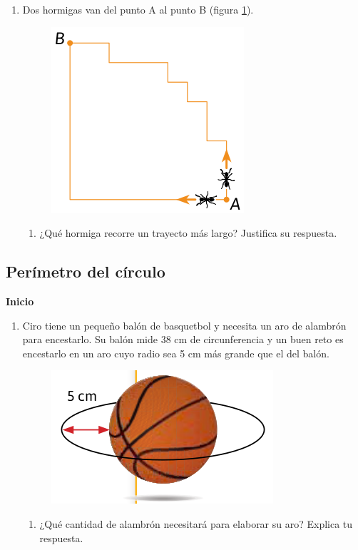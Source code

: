 \documentclass[11pt]{book}
\begin{document}
\begin{boxK}
\begin{enumerate}
    \item Dos hormigas van del punto A al punto B (figura \ref{fig:hormigas}).
          \begin{figure}[H]
            \centering
            \includegraphics[width=.25\linewidth]{hormigas.png}
            \label{fig:hormigas}
          \end{figure}
          \begin{enumerate}
            \item ¿Qué hormiga recorre un trayecto más largo? Justifica su respuesta.
          \end{enumerate}
  \end{enumerate}
\end{boxK}


\subsection{Perímetro del círculo}

\begin{boxK}
  \begin{center}\textbf{Inicio}\end{center}

  \begin{enumerate}
    \item Ciro tiene un pequeño balón de basquetbol y necesita un aro de alambrón para encestarlo.
          Su balón mide 38 cm de circunferencia y un buen
          reto es encestarlo en un aro cuyo radio sea 5 cm más grande que el del
          balón.
          \begin{figure}[H]
            \centering
            \includegraphics[width=.35\linewidth]{balon.png}
            \label{fig:balon}
          \end{figure}
          \begin{enumerate}
            \item ¿Qué cantidad de alambrón necesitará para elaborar su aro? Explica tu respuesta.
          \end{enumerate}
  \end{enumerate}
\end{boxK}
\end{document}
